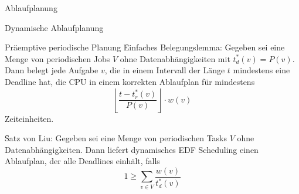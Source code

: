 \begin{chapter}{Ablaufplanung}
\begin{section}{Dynamische Ablaufplanung}
\begin{subsection}{Präemptive periodische Planung}
   \f{Einfaches Belegungslemma:} Gegeben sei eine Menge von periodischen Jobs $V$ ohne Datenabhängigkeiten mit $t_d^*(v)=P(v)$. Dann belegt jede Aufgabe $v$, die in einem Intervall der Länge $t$ mindestens eine Deadline hat, die CPU in einem korrekten Ablaufplan für mindestens
   \[ \left\lfloor \frac{t-t_r^*(v)}{P(v)} \right\rfloor \cdot w(v) \]
   Zeiteinheiten.
   
   \f{Satz von Liu:} Gegeben sei eine Menge von periodischen Tasks $V$ ohne Datenabhängigkeiten. Dann liefert dynamisches EDF Scheduling einen Ablaufplan, der alle Deadlines einhält, falls
   \[ 1 \geq \sum_{v\in V} \frac{w(v)}{t_d^*(v)} \]



  \end{subsection}
  \end{section}
\end{chapter}
